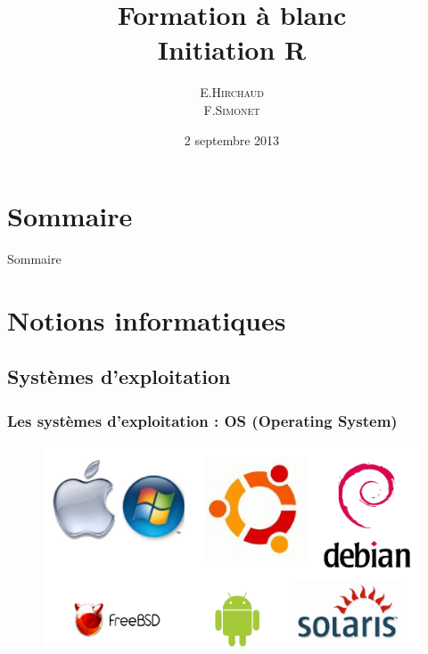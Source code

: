 \documentclass[table,svgnames,hyperref={pdfpagemode=FullScreen}]{beamer}
\title{Formation à blanc \\Initiation R}
\institute{BiRD}
\date{2 septembre 2013}
\author{\textsc{E.Hirchaud\\ F.Simonet}}
\begin{document}
\begin{frame}
	\titlepage
\end{frame}
	

\section*{Sommaire}
\begin{frame}{Sommaire}
	\small \tableofcontents
\end{frame}

\section{Notions informatiques}

\subsection{Systèmes d'exploitation}
\begin{frame}
	\frametitle{Les systèmes d'exploitation : OS (Operating System)}
	\begin{figure}
		\includegraphics[scale=0.55]{image/OSimage.png}
	\end{figure}
\end{frame}
\end{document}
